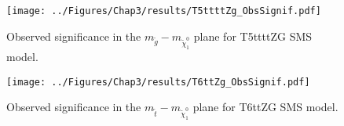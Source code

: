 \begin{figure}[h]
\centering
\texttt{[image: ../Figures/Chap3/results/T5ttttZg\_ObsSignif.pdf]}
\caption{Observed significance in the $m_{\tilde{g}}-m_{\tilde{\chi}_{1}^{0}}$ plane for
 T5ttttZG SMS model.}
\label{fig:T5ttttSignficance}
\end{figure}

\begin{figure}[h]
\centering
\texttt{[image: ../Figures/Chap3/results/T6ttZg\_ObsSignif.pdf]}
\caption{Observed significance in the $m_{\tilde{t}}-m_{\tilde{\chi}_{1}^{0}}$ plane for
 T6ttZG SMS model.}
\label{fig:T6ttSignficance}
\end{figure}

